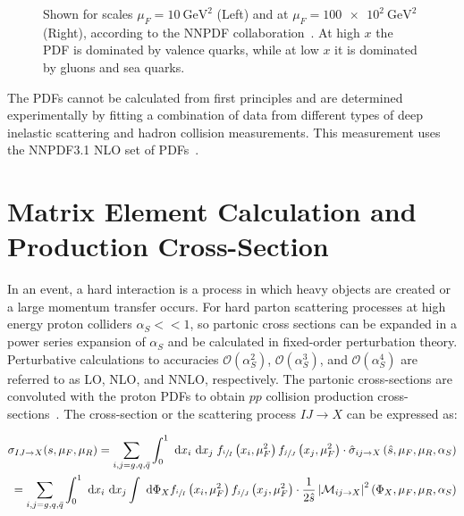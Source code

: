 \begin{refsection}
\begin{figure}[htb]
\begin{center}
{    Shown for scales $\mu_F = \SI{10}{\GeV \squared}$ (Left) and at $\mu_F = \SI{100e2}{\GeV \squared}$ (Right), according to the NNPDF collaboration~\cite{Ball:2267455}.
    At high $x$ the PDF is dominated by valence quarks, while at low $x$ it is dominated by gluons and sea quarks.
            }
    \label{Parton_Distribution_Functions}
  \end{center}
\end{figure}
The PDFs cannot be calculated from first principles and are determined experimentally by fitting a combination of data from different types of deep inelastic scattering and hadron collision measurements.
This measurement uses the NNPDF3.1 NLO set of PDFs~\cite{Ball:2267455}.

\section{Matrix Element Calculation and Production Cross-Section}
\label{sec:Matrix_Element_Calculation_and_Production_Cross-section}
In an event, a hard interaction is a process in which heavy objects are created or a large momentum transfer occurs.
For hard parton scattering processes at high energy proton colliders $\alpha_S << 1$, so partonic cross sections can be expanded in a power series expansion of $\alpha_S$ and be calculated in fixed-order perturbation theory. 
Perturbative calculations to accuracies $\mathcal{O}(\alpha^2_S)$, $\mathcal{O}(\alpha^3_S)$, and $\mathcal{O}(\alpha^4_S)$ are referred to as LO, NLO, and NNLO, respectively.
The partonic cross-sections are convoluted with the proton PDFs to obtain $pp$ collision production cross-sections~\cite{BUCKLEY2011145}.
The cross-section or the scattering process $IJ \rightarrow X$ can be expressed as:
\begin{linenomath*}
\begin{align}
\sigma_{IJ \rightarrow X}(s, \mu_F, \mu_R) = \sum_{i, j = g, q, \bar{q}}^{} \int_{0}^{1} \mathrm{~d} x_i \mathrm{~d} x_j \; f_{\sfrac{i}{I}}\left(x_i, \mu_F^2\right) f_{\sfrac{j}{J}}\left(x_j, \mu_F^2\right) \cdot \hat{\sigma}_{i j \rightarrow X}\left(\hat{s}, \mu_F, \mu_R, \alpha_S\right) \\
=\sum_{i, j=g, q, \bar{q}} \int_{0}^{1} \mathrm{~d} x_i \mathrm{~d} x_j \int \mathrm{~d} \Phi_X f_{\sfrac{i}{I}}\left(x_i, \mu_F^2\right) f_{\sfrac{j}{J}}\left(x_j, \mu_F^2\right) \cdot \frac{1}{2 \hat{s}}\left\vert \mathcal{M}_{i j \rightarrow X}\right\vert^2\left(\Phi_X, \mu_F, \mu_R, \alpha_S\right)
\label{ttbar_crosssection}
\end{align}

\end{linenomath*}
\end{refsection}
